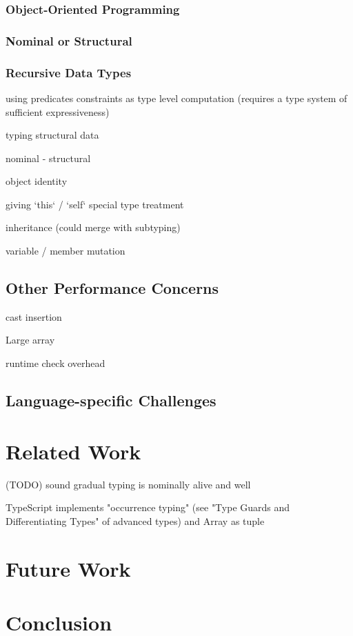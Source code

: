 \subsection{Object-Oriented Programming}

\subsection{Nominal or Structural}

\subsection{Recursive Data Types}

using predicates
constraints as type level computation (requires a type system of sufficient expressiveness)

typing structural data

nominal
- structural

object identity

giving `this` / `self` special type treatment

inheritance (could merge with subtyping)

variable / member mutation

\section{Other Performance Concerns}

cast insertion

Large array

runtime check overhead

\section{Language-specific Challenges}

\renewcommand{\thechapter}{4}
\chapter{Related Work}

(TODO) sound gradual typing is nominally alive and well


TypeScript implements "occurrence typing" (see "Type Guards and Differentiating Types" of advanced types) and Array as tuple 
\renewcommand{\thechapter}{5}

\chapter{Future Work}

\renewcommand{\thechapter}{6}
\chapter{Conclusion}